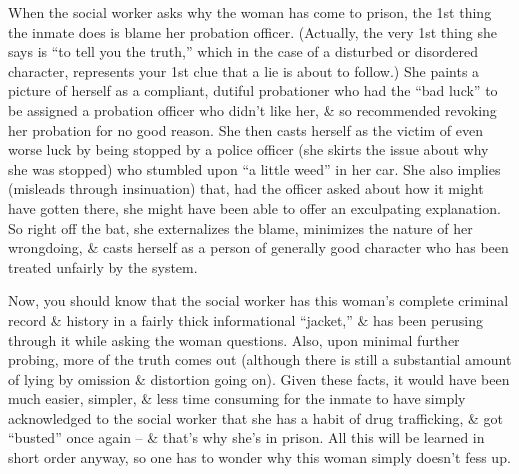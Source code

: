 \documentclass{article}
\numberwithin{equation}{section}
\begin{document}
When the social worker asks why the woman has come to prison, the 1st thing the inmate does is blame her probation officer. (Actually, the very 1st thing she says is ``to tell you the truth,'' which in the case of a disturbed or disordered character, represents your 1st clue that a lie is about to follow.) She paints a picture of herself as a compliant, dutiful probationer who had the ``bad luck'' to be assigned a probation officer who didn't like her, \& so recommended revoking her probation for no good reason. She then casts herself as the victim of even worse luck by being stopped by a police officer (she skirts the issue about why she was stopped) who stumbled upon ``a little weed'' in her car. She also implies (misleads through insinuation) that, had the officer asked about how it might have gotten there, she might have been able to offer an exculpating explanation. So right off the bat, she externalizes the blame, minimizes the nature of her wrongdoing, \& casts herself as a person of generally good character who has been treated unfairly by the system.

Now, you should know that the social worker has this woman's complete criminal record \& history in a fairly thick informational ``jacket,'' \& has been perusing through it while asking the woman questions. Also, upon minimal further probing, more of the truth comes out (although there is still a substantial amount of lying by omission \& distortion going on). Given these facts, it would have been much easier, simpler, \& less time consuming for the inmate to have simply acknowledged to the social worker that she has a habit of drug trafficking, \& got ``busted'' once again -- \& that's why she's in prison. All this will be learned in short order anyway, so one has to wonder why this woman simply doesn't fess up.
\end{document}
